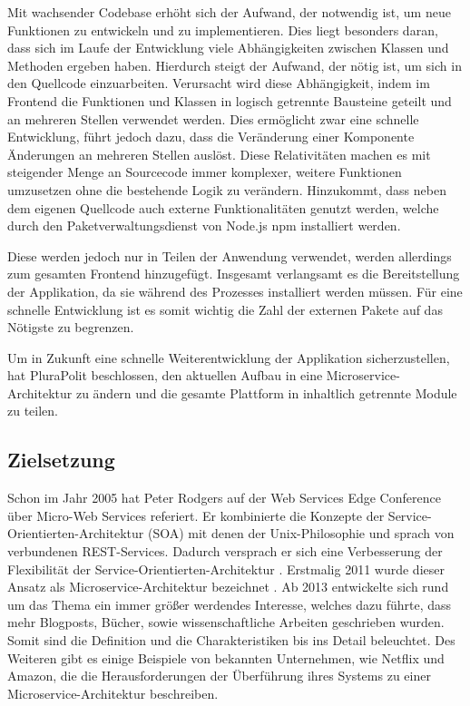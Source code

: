 Mit wachsender Codebase erhöht sich der Aufwand, der notwendig ist, um neue Funktionen zu entwickeln und zu implementieren. Dies liegt besonders daran, dass sich im Laufe der Entwicklung viele Abhängigkeiten zwischen Klassen und Methoden ergeben haben. Hierdurch steigt der Aufwand, der nötig ist, um sich in den Quellcode einzuarbeiten. Verursacht wird diese Abhängigkeit, indem im Frontend die Funktionen und Klassen in logisch getrennte Bausteine geteilt und an mehreren Stellen verwendet werden. Dies ermöglicht zwar eine schnelle Entwicklung, führt jedoch dazu, dass die Veränderung einer Komponente Änderungen an mehreren Stellen auslöst. Diese Relativitäten machen es mit steigender Menge an Sourcecode immer komplexer, weitere Funktionen umzusetzen ohne die bestehende Logik zu verändern. Hinzukommt, dass neben dem eigenen Quellcode auch externe Funktionalitäten genutzt werden, welche durch den Paketverwaltungsdienst von Node.js \parencite{nodejs} npm installiert werden.

Diese werden jedoch nur in Teilen der Anwendung verwendet, werden allerdings zum gesamten Frontend hinzugefügt. Insgesamt verlangsamt es die Bereitstellung der Applikation, da sie während des Prozesses installiert werden müssen. Für eine schnelle Entwicklung ist es somit wichtig die Zahl der externen Pakete auf das Nötigste zu begrenzen.

Um in Zukunft eine schnelle Weiterentwicklung der Applikation sicherzustellen, hat PluraPolit beschlossen, den aktuellen Aufbau in eine Microservice-Architektur zu ändern und die gesamte Plattform in inhaltlich getrennte Module zu teilen.

\subsection{Zielsetzung}
\label{sec:zielsetzung}

Schon im Jahr 2005 hat Peter Rodgers auf der Web Services Edge Conference über Micro-Web Services referiert. Er kombinierte die Konzepte der Service-Orientierten-Architektur (SOA) mit denen der Unix-Philosophie und sprach von verbundenen REST-Services. Dadurch versprach er sich eine Verbesserung der Flexibilität der Service-Orientierten-Architektur \parencite[vgl.][]{rodgers_peter}. Erstmalig 2011 wurde dieser Ansatz als Microservice-Architektur bezeichnet \parencite[vgl.][]{dragoni_microservices_2017}. Ab 2013 entwickelte sich rund um das Thema ein immer größer werdendes Interesse, welches dazu führte, dass mehr Blogposts, Bücher, sowie wissenschaftliche Arbeiten geschrieben wurden. Somit sind die Definition und die Charakteristiken bis ins Detail beleuchtet. Des Weiteren gibt es einige Beispiele von bekannten Unternehmen, wie Netflix und Amazon, die die Herausforderungen der Überführung ihres Systems zu einer Microservice-Architektur beschreiben.

